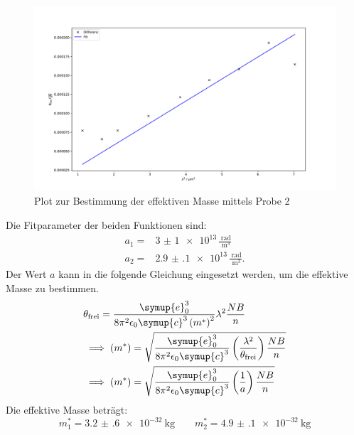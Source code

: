 \begin{figure}
  \centering
  \includegraphics[width = \textwidth]{figure/Theta2_diff_plot.pdf}
  \caption{Plot zur Bestimmung der effektiven Masse mittels Probe 2}
  \label{fig:fit2}
\end{figure}
\FloatBarrier
Die Fitparameter der beiden Funktionen sind:
\begin{align*}
  a_{\text{1}} =& \num{3(1)e13}  \,\frac{\SI{}{\radian}}{\SI{}{\cubic\meter}}\\
  a_{\text{2}} =& \num{2.9(1)e13}\,\frac{\SI{}{\radian}}{\SI{}{\cubic\meter}}.
\end{align*}
Der Wert $a$ kann in die folgende Gleichung eingesetzt werden, um die effektive Masse zu bestimmen.
\begin{align*}
  &\theta_{\text{frei}} = \frac{\symup{e}_0^3}{8\pi^2\epsilon_0\symup{c}^3 \left(m^*\right)^2}\lambda^2\frac{NB}{n}\\
  &\implies \left(m^*\right)=\sqrt{\frac{\symup{e}_0^3}{8\pi^2\epsilon_0\symup{c}^3} \left(\frac{\lambda^2}{\theta_{\text{frei}}}\right)\frac{NB}{n} }\\
  &\implies \left(m^*\right)=\sqrt{\frac{\symup{e}_0^3}{8\pi^2\epsilon_0\symup{c}^3} \left(\frac{1}{a}\right)\frac{NB}{n} }
\end{align*}
Die effektive Masse beträgt:
\begin{equation*}
  m^*_1 = \SI{3.2(6)e-32}{\kilo\gram}\qquad m^*_2 = \SI{4.9(1)e-32}{\kilo\gram}
\end{equation*}